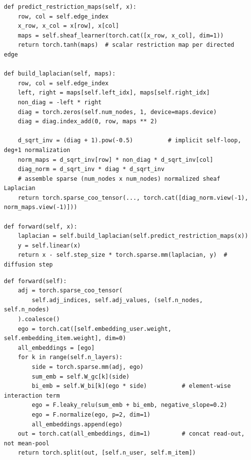 \begin{lstlisting}[caption={Sheaf4Rec: a learned scalar restriction map per edge builds a normalized sheaf Laplacian, then diffuses node features through it (Purificato et al., ACM TORS'23/25).}, label={lst:sheaf4rec}]
def predict_restriction_maps(self, x):
    row, col = self.edge_index
    x_row, x_col = x[row], x[col]
    maps = self.sheaf_learner(torch.cat([x_row, x_col], dim=1))
    return torch.tanh(maps)  # scalar restriction map per directed edge

def build_laplacian(self, maps):
    row, col = self.edge_index
    left, right = maps[self.left_idx], maps[self.right_idx]
    non_diag = -left * right
    diag = torch.zeros(self.num_nodes, 1, device=maps.device)
    diag = diag.index_add(0, row, maps ** 2)

    d_sqrt_inv = (diag + 1).pow(-0.5)          # implicit self-loop, deg+1 normalization
    norm_maps = d_sqrt_inv[row] * non_diag * d_sqrt_inv[col]
    diag_norm = d_sqrt_inv * diag * d_sqrt_inv
    # assemble sparse (num_nodes x num_nodes) normalized sheaf Laplacian
    return torch.sparse_coo_tensor(..., torch.cat([diag_norm.view(-1), norm_maps.view(-1)]))

def forward(self, x):
    laplacian = self.build_laplacian(self.predict_restriction_maps(x))
    y = self.linear(x)
    return x - self.step_size * torch.sparse.mm(laplacian, y)  # diffusion step
\end{lstlisting}

\begin{lstlisting}[caption={NGCF: unlike LightGCN, each layer has its own learned $W_{gc}$/$W_{bi}$, an explicit element-wise interaction term $\mathrm{ego} \odot \mathrm{side}$, and layers are concatenated (not averaged) at read-out (Wang et al., SIGIR'19).}, label={lst:ngcf}]
def forward(self):
    adj = torch.sparse_coo_tensor(
        self.adj_indices, self.adj_values, (self.n_nodes, self.n_nodes)
    ).coalesce()
    ego = torch.cat([self.embedding_user.weight, self.embedding_item.weight], dim=0)
    all_embeddings = [ego]
    for k in range(self.n_layers):
        side = torch.sparse.mm(adj, ego)
        sum_emb = self.W_gc[k](side)
        bi_emb = self.W_bi[k](ego * side)          # element-wise interaction term
        ego = F.leaky_relu(sum_emb + bi_emb, negative_slope=0.2)
        ego = F.normalize(ego, p=2, dim=1)
        all_embeddings.append(ego)
    out = torch.cat(all_embeddings, dim=1)         # concat read-out, not mean-pool
    return torch.split(out, [self.n_user, self.m_item])
\end{lstlisting}

